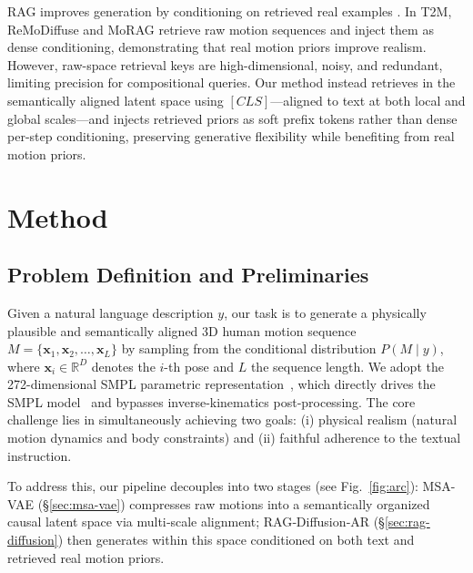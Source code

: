 \documentclass{article}
\begin{document}
RAG improves generation by conditioning on retrieved real examples \citep{lewis2020retrieval,gao2023retrieval,blattmann2022retrieval,ren2026videorag}.
In T2M, ReMoDiffuse \citep{zhang2023remodiffuse} and MoRAG \citep{kalakonda2025morag} retrieve raw motion sequences and inject them as dense conditioning, demonstrating that real motion priors improve realism.
However, raw-space retrieval keys are high-dimensional, noisy, and redundant, limiting precision for compositional queries.
Our method instead retrieves in the semantically aligned latent space using \([CLS]\)---aligned to text at both local and global scales---and injects retrieved priors as soft prefix tokens rather than dense per-step conditioning, preserving generative flexibility while benefiting from real motion priors.


\section{Method}

\subsection{Problem Definition and Preliminaries}

Given a natural language description \(y\), our task is to generate a physically plausible and semantically aligned 3D human motion sequence \(M = \{\mathbf{x}_1, \mathbf{x}_2, \dots, \mathbf{x}_L\}\) by sampling from the conditional distribution \(P(M \mid y)\), where \(\mathbf{x}_i \in \mathbb{R}^D\) denotes the \(i\)-th pose and \(L\) the sequence length.
We adopt the 272-dimensional SMPL parametric representation~\citep{xiao2025motionstreamer}, which directly drives the SMPL model~\citep{loper2023smpl} and bypasses inverse‑kinematics post‑processing.
The core challenge lies in simultaneously achieving two goals: (i) physical realism (natural motion dynamics and body constraints) and (ii) faithful adherence to the textual instruction.

To address this, our pipeline decouples into two stages (see Fig.~\ref{fig:arc}): MSA-VAE (\S\ref{sec:msa-vae}) compresses raw motions into a semantically organized causal latent space via multi‑scale alignment; RAG‑Diffusion‑AR (\S\ref{sec:rag-diffusion}) then generates within this space conditioned on both text and retrieved real motion priors.
\end{document}
